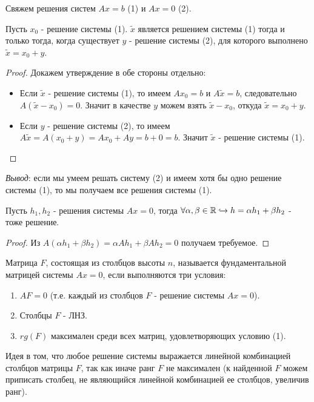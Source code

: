 Свяжем решения систем $Ax=b$ (1) и $Ax=0$ (2).
\begin{proposition}
    Пусть $x_0$ - решение системы (1). $\tilde{x}$ является решением системы (1) тогда и только тогда, когда существует $y$ - решение системы (2), для которого выполнено $\tilde{x} = x_0 +y$.
\end{proposition}
\begin{proof}
    Докажем утверждение в обе стороны отдельно:
    \begin{itemize}
        \item[$\Rightarrow$] Если $\tilde{x}$ - решение системы (1), то имеем $Ax_0=b$ и $A\tilde{x}=b$, следовательно $A(\tilde{x} - x_0)=0$. Значит в качестве $y$ можем взять $\tilde{x}-x_0$, откуда $\tilde{x}=x_0 + y$.
        \item[$\Leftarrow$] Если $y$ - решение системы (2), то имеем $A\tilde{x}=A(x_0+y)=Ax_0+Ay=b+0=b$. Значит $\tilde{x}$ - решение системы (1).
    \end{itemize}
\end{proof}
\textit{Вывод}: если мы умеем решать систему (2) и имеем хотя бы одно решение системы (1), то мы получаем все решения системы (1).
\begin{proposition}
    Пусть $h_1, h_2$ - решения системы $Ax=0$, тогда $\forall \alpha, \beta \in \mathbb{R} \hookrightarrow h=\alpha h_1 + \beta h_2$ - тоже решение.
\end{proposition}
\begin{proof}
    Из $A(\alpha h_1 + \beta h_2)=\alpha A h_1 + \beta A h_2=0$ получаем требуемое.
\end{proof}
\begin{definition}
\label{Фундаментальная система решений.}
    Матрица $F$, состоящая из столбцов высоты $n$, называется фундаментальной матрицей системы $Ax=0$, если выполняются три условия:
    \begin{enumerate}
        \item $AF=0$ (т.е. каждый из столбцов $F$ - решение системы $Ax=0$).
        \item Столбцы $F$ - ЛНЗ.
        \item $rg(F)$ максимален среди всех матриц, удовлетворяющих условию (1).
    \end{enumerate}
\end{definition}
Идея в том, что любое решение системы выражается линейной комбинацией столбцов матрицы $F$, так как иначе ранг $F$ не максимален (к найденной $F$ можем приписать столбец, не являющийся линейной комбинацией ее столбцов, увеличив ранг).
